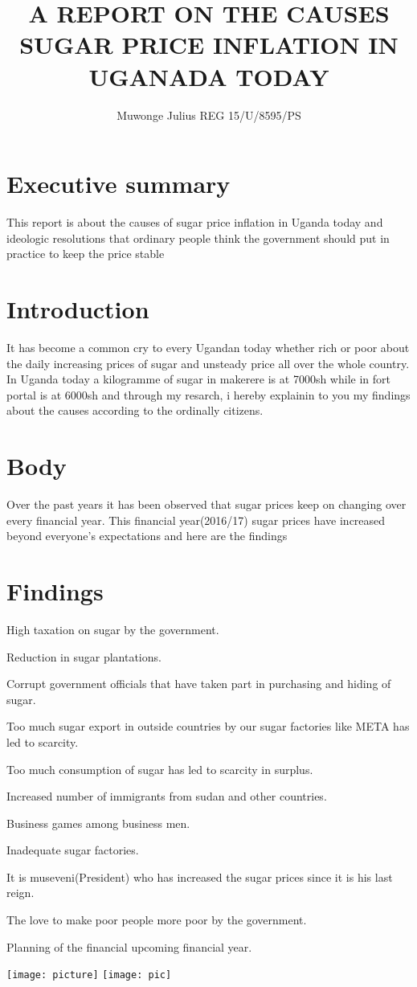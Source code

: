 \documentclass{article}
\begin{document}
\author{Muwonge Julius REG 15/U/8595/PS}
\title{A REPORT ON THE CAUSES SUGAR PRICE INFLATION IN UGANADA TODAY}
\maketitle
\section{Executive summary}{This report is about the causes of sugar price inflation in Uganda today and ideologic resolutions that ordinary people think the government should put in practice to keep the price stable 
}
\section{Introduction}{
It has become a common cry to every Ugandan today whether rich or poor about the daily increasing prices of sugar and unsteady price all over the whole country. In Uganda today a kilogramme of sugar in makerere is at 7000sh while in fort portal is at 6000sh and through my resarch, i hereby explainin to you my findings about the causes according to the ordinally citizens.
}
\section{Body}{
Over the past years it has been observed that sugar prices keep on changing over every financial year. This financial year(2016/17) sugar prices have increased beyond everyone's expectations and here are the findings
}
\section{Findings}{\par
High taxation on sugar by the government.\par
Reduction in sugar plantations.\par
Corrupt government officials that have taken part in purchasing and hiding of sugar.\par
Too much sugar export in outside countries by our sugar factories like META has led to scarcity.\par
Too much consumption of sugar has led to scarcity in surplus.\par
Increased number of immigrants from sudan and other countries.\par
Business games among business men.\par
Inadequate sugar factories.\par
It is museveni(President) who has increased the sugar prices since it is his last reign.\par
The love to make poor people more poor by the government.\par
Planning of the financial upcoming financial year.\par
\texttt{[image: picture]}
\texttt{[image: pic]}
 }
\end{document}
